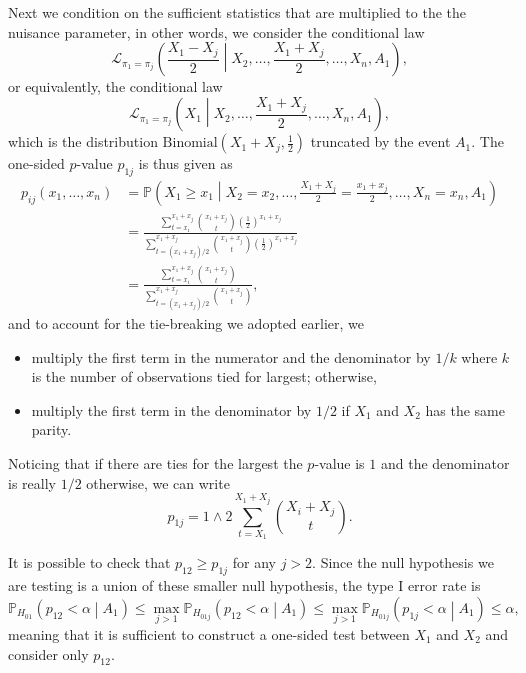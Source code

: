 \documentclass[11pt]{article}
\newcommand{\PP}{\mathbb{P}}
\begin{document}
Next we condition on the sufficient statistics that are multiplied to the the nuisance parameter, in other words, we consider the conditional law
$$\mathcal{L}_{\pi_1 = \pi_j}\left(\frac{X_1 - X_j}{2} \middle| X_2, \ldots, \frac{X_1 + X_j}{2}, \ldots, X_n, A_1\right),$$
or equivalently, the conditional law
$$\mathcal{L}_{\pi_1 = \pi_j}\left(X_1 \middle| X_2, \ldots, \frac{X_1 + X_j}{2}, \ldots, X_n, A_1\right),$$
which is the distribution $\text{Binomial}\left(X_1 + X_j, \frac{1}{2}\right)$ truncated by the event $A_1$. The one-sided $p$-value $p_{1j}$ is thus given as
\begin{align*}
p_{ij}\left(x_1, \ldots, x_n\right) & = \PP\left(X_1 \ge x_1 \middle| X_2 = x_2, \ldots, \frac{X_1 + X_j}{2} = \frac{x_1 + x_j}{2}, \ldots, X_n = x_n, A_1\right) \\
& = \frac{\sum_{t = x_1}^{x_1 + x_j} \binom{x_1 + x_j}{t} \left(\frac{1}{2}\right)^{x_1 + x_j}}{\sum_{t = \left(x_1 + x_j\right)/2}^{x_1 + x_j} \binom{x_1 + x_j}{t} \left(\frac{1}{2}\right)^{x_1 + x_j}} \\
& = \frac{\sum_{t = x_1}^{x_1 + x_j} \binom{x_1 + x_j}{t}}{\sum_{t = \left(x_1 + x_j\right)/2}^{x_1 + x_j} \binom{x_1 + x_j}{t}},
\end{align*}
and to account for the tie-breaking we adopted earlier, we
\begin{itemize}
\item multiply the first term in the numerator and the denominator by $1/k$ where $k$ is the number of observations tied for largest; otherwise,
\item multiply the first term in the denominator by $1/2$ if $X_1$ and $X_2$ has the same parity.
\end{itemize}
Noticing that if there are ties for the largest the $p$-value is $1$ and the denominator is really $1/2$ otherwise, we can write
$$p_{1j} = 1 \wedge 2 \sum_{t=X_1}^{X_1 + X_j} \binom{X_i + X_j}{t}.$$

It is possible to check that $p_{12} \ge p_{1j}$ for any $j > 2$. Since the null hypothesis we are testing is a union of these smaller null hypothesis, the type I error rate is
$$\PP_{H_{01}}\left(p_{12} < \alpha \middle| A_1\right) \le \max_{j>1} \PP_{H_{01j}}\left(p_{12} < \alpha \middle| A_1\right) \le \max_{j>1} \PP_{H_{01j}}\left(p_{1j} < \alpha \middle| A_1\right) \le \alpha,$$
meaning that it is sufficient to construct a one-sided test between $X_1$ and $X_2$ and consider only $p_{12}$.
\end{document}
